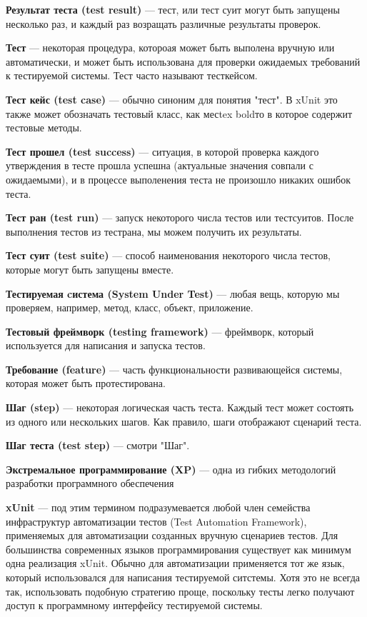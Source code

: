 {\bf Результат теста (test result)} ---
тест, или тест суит могут быть запущены несколько раз, и каждый раз возращать различные результаты проверок.

{\bf Тест} ---
некоторая процедура, котороая может быть выполена вручную или автоматически, и может быть использована для проверки ожидаемых требований к тестируемой системы. Тест часто называют тесткейсом.

{\bf Тест кейс (test case)} ---
обычно синоним для понятия "тест". В xUnit это также может обозначать тестовый класс, как месtex boldто в которое содержит тестовые методы.

{\bf Тест прошел (test success)} ---
ситуация, в которой проверка каждого утверждения в тесте прошла успешна (актуальные значения совпали с ожидаемыми), и в процессе выполенения теста не произошло никаких ошибок теста.

{\bf Тест ран (test run)} ---
запуск некоторого числа тестов или тестсуитов. После выполнения тестов из тестрана, мы можем получить их результаты.

{\bf Тест суит (test suite)} ---
способ наименования некоторого числа тестов, которые могут быть запущены вместе.

{\bf Тестируемая cистема (System Under Test)} ---
любая вещь, которую мы проверяем, например, метод, класс, объект, приложение.

{\bf Тестовый фреймворк (testing framework)} --- фреймворк, который используется для написания и запуска тестов.

{\bf Требование (feature)} ---
часть функциональности развивающейся системы, которая может быть протестирована.

{\bf Шаг (step)} ---
некоторая логическая часть теста. Каждый тест может состоять из одного или нескольких шагов. Как правило, шаги отображают сценарий теста.

{\bf Шаг теста (test step)} ---
смотри "Шаг".

{\bf Экстремальное программирование (XP)} ---
одна из гибких методологий разработки программного обеспечения

{\bf xUnit} ---
под этим термином подразумевается любой член семейства инфраструктур автоматизации тестов (Test Automation Framework), применяемых для автоматизации созданных вручную сценариев тестов. Для большинства современных языков программирования существует как минимум одна реализация xUnit. Обычно для автоматизации применяется тот же язык, который использовался для написания тестируемой ситстемы. Хотя это не всегда так, использовать подобную стратегию проще, поскольку тесты легко получают доступ к программному интерфейсу тестируемой системы.


